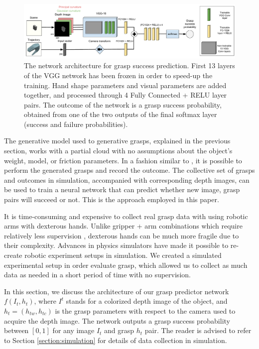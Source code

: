\begin{figure}[t]
  \includegraphics[width=\textwidth]{images/networkArchitecture.pdf}
  \caption{The network architecture for grasp success prediction. First 13 layers of the VGG network has been frozen in order to speed-up the training. Hand shape parameters and visual parameters are added together, and processed through 4 Fully Connected + RELU layer pairs. The outcome of the network is a grasp success probability, obtained from one of the two outputs of the final softmax layer (success and failure probabilities).}
\label{fig:networkArchitecture}
\end{figure}

The generative model used to generative grasps, explained in the previous section, works with a partial cloud with no assumptions about the object's weight, model, or friction parameters. In a fashion similar to \cite{Levine1}, it is possible to perform the generated grasps and record the outcome. The collective set of grasps and outcomes in simulation, accompanied with corresponding depth images, can be used to train a neural network that can predict whether new image, grasp pairs will succeed or not. This is the approach employed in this paper. 

It is time-consuming and expensive to collect real grasp data with using robotic arms with dexterous hands. Unlike gripper + arm combinations which require relatively less supervision \cite{Levine1}, dexterous hands can be much more fragile due to their complexity. Advances in physics simulators have made it possible to re-create robotic experiment setups in simulation. We created a simulated experimental setup in order evaluate grasp, which allowed us to collect as much data as needed in a short period of time with no supervision.

In this section, we discuss the architecture of our grasp predictor network $f(I_t, h_t)$, where $I^t$ stands for a colorized depth image of the object, and $h_t = (h_{tw}, h_{tc})$ is the grasp parameters with respect to the camera used to acquire the depth image. The network outputs a grasp success probability between $[0,1]$ for any image $I_t$ and grasp $h_t$ pair. The reader is advised to refer to Section \ref{section:simulation} for details of data collection in simulation.

